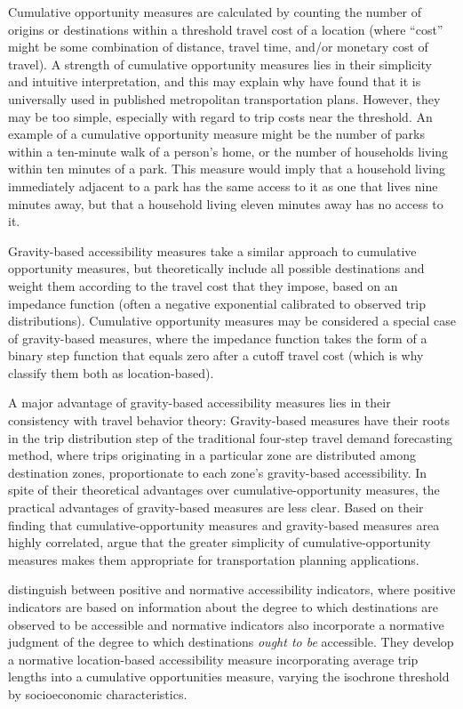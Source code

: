 \documentclass[3p, authoryear, review]{elsarticle} %
\begin{document}
Cumulative opportunity measures are calculated by counting the number of origins
or destinations within a threshold travel cost of a location (where ``cost'' might
be some combination of distance, travel time, and/or monetary cost of travel). A
strength of cumulative opportunity measures lies in their simplicity and
intuitive interpretation, and this may explain why \citet{boisjoly2017get} have found that
it is universally used in published metropolitan transportation plans. However, they may
be too simple, especially with regard to trip costs near the threshold. An example
of a cumulative opportunity measure might be the number of parks within a ten-minute
walk of a person's home, or the number of households living within ten minutes of a
park. This measure would imply that a household living immediately adjacent to a park
has the same access to it as one that lives nine minutes away, but that a household
living eleven minutes away has no access to it.

Gravity-based accessibility measures take a similar approach to cumulative
opportunity measures, but theoretically include all possible destinations and
weight them according to the travel cost that they impose, based on an impedance
function (often a negative exponential calibrated to observed trip
distributions). Cumulative opportunity measures may be considered a special case
of gravity-based measures, where the impedance function takes the form of a
binary step function that equals zero after a cutoff travel cost (which is why
\citet{GEURS2004127} classify them both as location-based).

A major advantage of gravity-based accessibility measures lies in their
consistency with travel behavior theory: Gravity-based measures have their roots
in the trip distribution step of the traditional four-step travel demand
forecasting method, where trips originating in a particular zone are distributed
among destination zones, proportionate to each zone's gravity-based
accessibility. In spite of their theoretical advantages over cumulative-opportunity
measures, the practical advantages of gravity-based measures are less clear. Based on
their finding that cumulative-opportunity measures and gravity-based measures area
highly correlated, \citet{boisjoly2016daily} argue that the greater simplicity of
cumulative-opportunity measures makes them appropriate for transportation planning
applications.

\citet{paez2012measuring} distinguish between positive and normative accessibility indicators,
where positive indicators are based on information about the degree to which
destinations are observed to be accessible and normative indicators also incorporate a
normative judgment of the degree to which destinations \emph{ought to be} accessible. They
develop a normative location-based accessibility measure incorporating average trip
lengths into a cumulative opportunities measure, varying the isochrone threshold by
socioeconomic characteristics.
\end{document}
